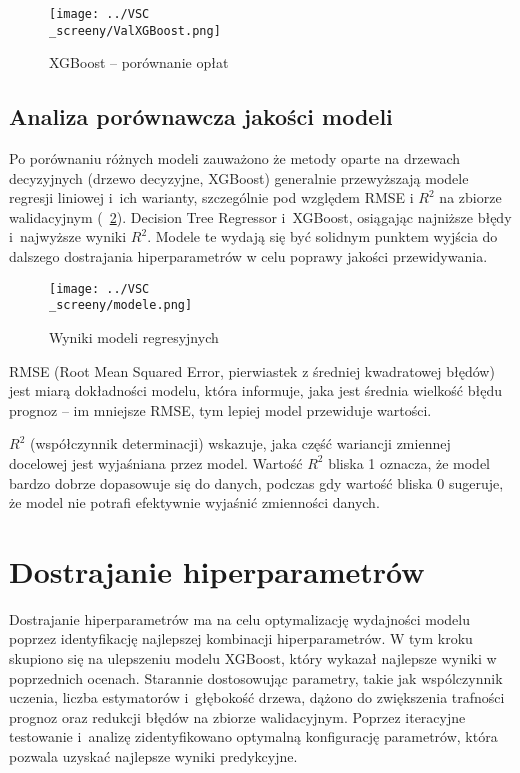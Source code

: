 \documentclass[12pt,a4paper]{report}
\theoremstyle{definition} %
\begin{document}
	\begin{figure}[H]
	    \centering
	    \texttt{[image: ../VSC\\\_screeny/ValXGBoost.png]} 
	    \caption{XGBoost – porównanie opłat}
	    \label{fig:wykresXGBoost}
	\end{figure}

\subsection{Analiza porównawcza jakości modeli}
\hspace*{\parindent}Po porównaniu różnych modeli zauważono że metody oparte na drzewach decyzyjnych (drzewo decyzyjne, XGBoost) generalnie przewyższają modele regresji liniowej i~ich warianty, szczególnie pod względem RMSE i $R^2$ na zbiorze walidacyjnym (\figurename~\ref{fig:wynikiModeliRegresyjnych}). Decision Tree Regressor i~XGBoost, osiągając najniższe błędy i~najwyższe wyniki $R^2$. Modele te wydają się być solidnym punktem wyjścia do dalszego dostrajania hiperparametrów w celu poprawy jakości przewidywania.

	\begin{figure}[H]
	    \centering
	    \texttt{[image: ../VSC\\\_screeny/modele.png]} 
	    \caption{Wyniki modeli regresyjnych}
	    \label{fig:wynikiModeliRegresyjnych}
	\end{figure}
	
	RMSE (Root Mean Squared Error, pierwiastek z średniej kwadratowej błędów) jest miarą dokładności modelu, która informuje, jaka jest średnia wielkość błędu prognoz – im mniejsze RMSE, tym lepiej model przewiduje wartości.

	$R^2$ (współczynnik determinacji) wskazuje, jaka część wariancji zmiennej docelowej jest wyjaśniana przez model. Wartość $R^2$ bliska 1 oznacza, że model bardzo dobrze dopasowuje się do danych, podczas gdy wartość bliska 0 sugeruje, że model nie potrafi efektywnie wyjaśnić zmienności danych.

	\section{Dostrajanie hiperparametrów}
	\hspace*{\parindent}Dostrajanie hiperparametrów ma na celu optymalizację wydajności modelu poprzez identyfikację najlepszej kombinacji hiperparametrów. W tym kroku skupiono się na ulepszeniu modelu XGBoost, który wykazał najlepsze wyniki w poprzednich ocenach. Starannie dostosowując parametry, takie jak wspólczynnik uczenia, liczba 			estymatorów i~głębokość drzewa, dążono do zwiększenia trafności prognoz oraz redukcji błędów na zbiorze walidacyjnym. Poprzez iteracyjne testowanie i~analizę zidentyfikowano optymalną konfigurację parametrów, która pozwala uzyskać najlepsze wyniki predykcyjne.
	
\end{document}
